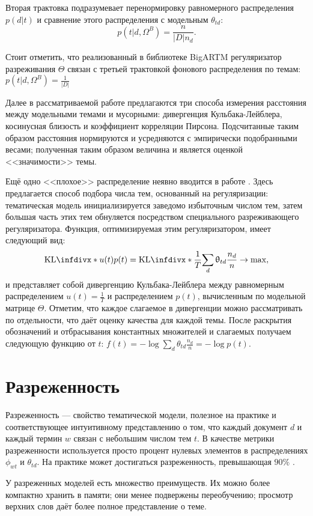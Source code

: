 Вторая трактовка подразумевает перенормировку равномерного распределения $p(d|t)$ и сравнение этого распределения с модельным $\theta_{td}$:
$$
    p(t|d, \Omega^B) = \frac{n}{|D| n_d}.
$$

Стоит отметить, что реализованный в библиотеке BigARTM регуляризатор разреживания $\Theta$ связан с третьей трактовкой фонового распределения по темам: $p(t|d, \Omega^B) = \frac{1}{|D|} $

Далее в рассматриваемой работе предлагаются три способа измерения расстояния между модельными темами и мусорными: дивергенция Кульбака-Лейблера, косинусная близость и коэффициент корреляции Пирсона. Подсчитанные таким образом расстояния нормируются и усредняются с эмпирически подобранными весами; полученная таким образом величина и является оценкой <<значимости>> темы.

Ещё одно <<плохое>> распределение неявно вводится в работе \cite{voron15plavin}. Здесь предлагается способ подбора числа тем, основанный на регуляризации: тематическая модель инициализируется заведомо избыточным числом тем, затем большая часть этих тем обнуляется посредством специального разреживающего регуляризатора. Функция, оптимизируемая этим регуляризатором, имеет следующий вид:
\[
    \textup{KL}\infdiv*{u(t)}{p(t)} = \textup{KL}\infdiv*{\frac{1}{T}}{\sum_d \theta_{td} \frac{n_d}{n}} \rightarrow \max,
\]
и представляет собой дивергенцию Кульбака-Лейблера между равномерным распределением $u(t) = \frac{1}{T}$ и распределением $p(t)$, вычисленным по модельной матрице $\Theta$. Отметим, что каждое слагаемое в дивергенции можно рассматривать по отдельности, что даёт оценку качества для каждой темы. После раскрытия обозначений и отбрасывания константных множителей и слагаемых получаем следующую функцию от $t$:
$f(t) = - \log \sum_d \theta_{td} \frac{n_d}{n} = -\log p(t)$.

\section{Разреженность}

Разреженность --- свойство тематической модели, полезное на практике и соответствующее интуитивному представлению о том, что каждый документ $d$ и каждый термин $w$ связан с небольшим числом тем $t$. В качестве метрики разреженности используется просто процент нулевых элементов в распределениях $\phi_{wt}$ и $\theta_{td}$. На практике может достигаться разреженность, превышающая $90\%$ \cite{potapenko2013robust}.

У разреженных моделей есть множество преимуществ. Их можно более компактно хранить в памяти; они менее подвержены переобучению; просмотр верхних слов даёт более полное представление о теме.

